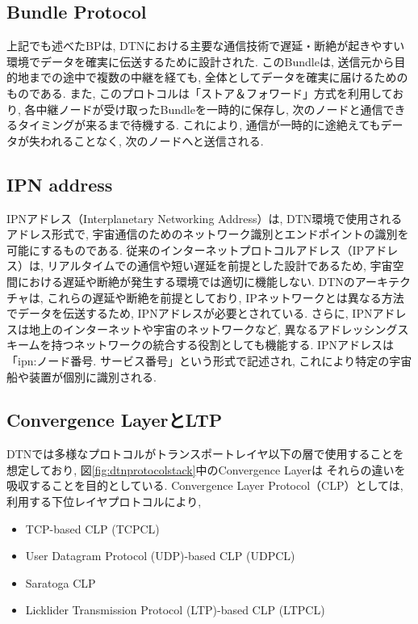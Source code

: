 \subsection{Bundle Protocol}
\label{subsection:Bundle Protocol}
上記でも述べたBPは, DTNにおける主要な通信技術で遅延・断絶が起きやすい環境でデータを確実に伝送するために設計された. 
このBundleは,  送信元から目的地までの途中で複数の中継を経ても, 全体としてデータを確実に届けるためのものである.  
また, このプロトコルは「ストア＆フォワード」方式を利用しており,  各中継ノードが受け取ったBundleを一時的に保存し,  
次のノードと通信できるタイミングが来るまで待機する.  これにより, 通信が一時的に途絶えてもデータが失われることなく,  次のノードへと送信される. 

\subsection{IPN address}
\label{subsection:IPN address}
IPNアドレス（Interplanetary Networking Address）は, DTN環境で使用されるアドレス形式で, 
宇宙通信のためのネットワーク識別とエンドポイントの識別を可能にするものである. 従来のインターネットプロトコルアドレス（IPアドレス）は, 
リアルタイムでの通信や短い遅延を前提とした設計であるため, 宇宙空間における遅延や断絶が発生する環境では適切に機能しない. 
DTNのアーキテクチャは, これらの遅延や断絶を前提としており, IPネットワークとは異なる方法でデータを伝送するため, 
IPNアドレスが必要とされている.  さらに,  IPNアドレスは地上のインターネットや宇宙のネットワークなど, 
異なるアドレッシングスキームを持つネットワークの統合する役割としても機能する. 
IPNアドレスは「ipn:ノード番号. サービス番号」という形式で記述され, これにより特定の宇宙船や装置が個別に識別される.  

\subsection{Convergence LayerとLTP}
\label{section:Convergence LayerとLTP}
DTNでは多様なプロトコルがトランスポートレイヤ以下の層で使用することを想定しており,  
図\ref{fig:dtnprotocolstack}中のConvergence Layerは
それらの違いを吸収することを目的としている.  Convergence Layer Protocol（CLP）としては,  
利用する下位レイヤプロトコルにより, 

\begin{itemize}
    \item TCP-based CLP (TCPCL)
    \item User Datagram Protocol (UDP)-based CLP (UDPCL)
    \item Saratoga CLP
    \item Licklider Transmission Protocol (LTP)-based CLP (LTPCL)
\end{itemize}

